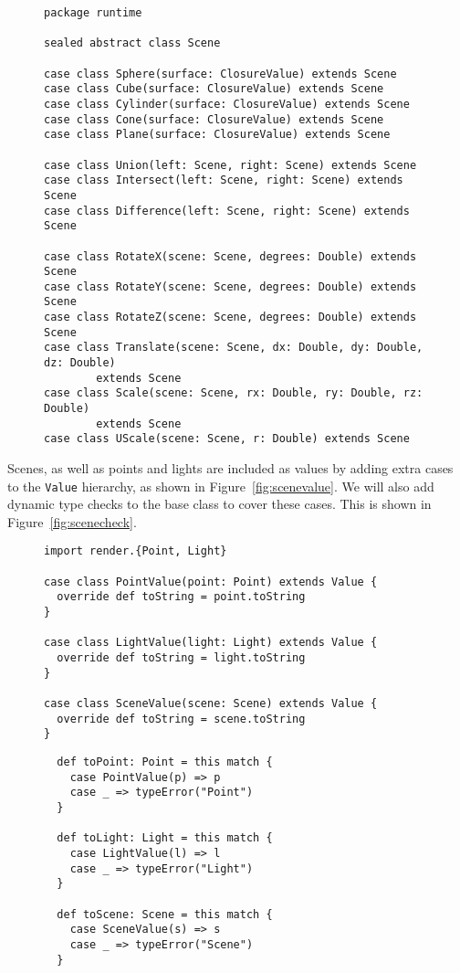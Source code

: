 \begin{figure}
\begin{verbatim}
package runtime

sealed abstract class Scene

case class Sphere(surface: ClosureValue) extends Scene
case class Cube(surface: ClosureValue) extends Scene
case class Cylinder(surface: ClosureValue) extends Scene
case class Cone(surface: ClosureValue) extends Scene
case class Plane(surface: ClosureValue) extends Scene

case class Union(left: Scene, right: Scene) extends Scene
case class Intersect(left: Scene, right: Scene) extends Scene
case class Difference(left: Scene, right: Scene) extends Scene

case class RotateX(scene: Scene, degrees: Double) extends Scene
case class RotateY(scene: Scene, degrees: Double) extends Scene
case class RotateZ(scene: Scene, degrees: Double) extends Scene
case class Translate(scene: Scene, dx: Double, dy: Double, dz: Double)
        extends Scene
case class Scale(scene: Scene, rx: Double, ry: Double, rz: Double)
        extends Scene
case class UScale(scene: Scene, r: Double) extends Scene
\end{verbatim}
\getcaption
\end{figure}

Scenes, as well as points and lights are included as values
by adding extra cases to the \verb!Value! hierarchy,
as shown in Figure~\ref{fig:scenevalue}.
We will also add dynamic type checks to the base class
to cover these cases.
This is shown in Figure~\ref{fig:scenecheck}.

\begin{figure}
\begin{verbatim}
import render.{Point, Light}

case class PointValue(point: Point) extends Value {
  override def toString = point.toString
}

case class LightValue(light: Light) extends Value {
  override def toString = light.toString
}

case class SceneValue(scene: Scene) extends Value {
  override def toString = scene.toString
}
\end{verbatim}
\getcaption
\end{figure}

\begin{figure}
\begin{verbatim}
  def toPoint: Point = this match {
    case PointValue(p) => p
    case _ => typeError("Point")
  }

  def toLight: Light = this match {
    case LightValue(l) => l
    case _ => typeError("Light")
  }

  def toScene: Scene = this match {
    case SceneValue(s) => s
    case _ => typeError("Scene")
  }
\end{verbatim}
\getcaption
\end{figure}

